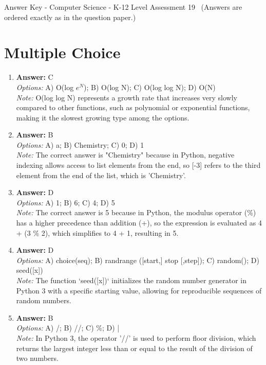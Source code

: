\documentclass[12pt]{article}
\begin{document}
\begin{center}
Answer Key - Computer Science - K-12 Level Assessment 19 \
\small (Answers are ordered exactly as in the question paper.)
\end{center}

\section*{Multiple Choice}
\begin{enumerate}[label=\arabic*.]
\item \textbf{Answer:} C
\\ \textit{Options:} A) O(log $e^N$); B) O(log N); C) O(log log N); D) O(N)
\\ \textit{Note:} O(log log N) represents a growth rate that increases very slowly compared to other functions, such as polynomial or exponential functions, making it the slowest growing type among the options.
\item \textbf{Answer:} B
\\ \textit{Options:} A) a; B) Chemistry; C) 0; D) 1
\\ \textit{Note:} The correct answer is "Chemistry" because in Python, negative indexing allows access to list elements from the end, so [-3] refers to the third element from the end of the list, which is 'Chemistry'.
\item \textbf{Answer:} D
\\ \textit{Options:} A) 1; B) 6; C) 4; D) 5
\\ \textit{Note:} The correct answer is 5 because in Python, the modulus operator (\%) has a higher precedence than addition (+), so the expression is evaluated as 4 + (3 \% 2), which simplifies to 4 + 1, resulting in 5.
\item \textbf{Answer:} D
\\ \textit{Options:} A) choice(seq); B) randrange ([start,] stop [,step]); C) random(); D) seed([x])
\\ \textit{Note:} The function `seed([x])` initializes the random number generator in Python 3 with a specific starting value, allowing for reproducible sequences of random numbers.
\item \textbf{Answer:} B
\\ \textit{Options:} A) /; B) //; C) \%; D) |
\\ \textit{Note:} In Python 3, the operator '//' is used to perform floor division, which returns the largest integer less than or equal to the result of the division of two numbers.
\end{enumerate}
\end{document}
